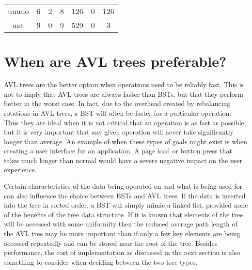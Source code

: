 \documentclass{article} %
\begin{document}
\begin{tabular}{c|c|c|c|c|c|c|}
\multicolumn{1}{|c|}{uuuuo} & 6                                                             & 2                                                              & 8                                                              & 126                                                           & 0                                                              & 126                                                            \\
\multicolumn{1}{|c|}{ant}   & 9                                                             & 0                                                              & 9                                                              & 529                                                           & 0                                                              & 3                                                              \\ \hline
\end{tabular}
\newpage
\doublespacing
\section{When are AVL trees preferable?}
\indent AVL trees are the better option when operations need to be reliably fast. This is not to imply that AVL trees are always faster than BSTs, but that they perform better in the worst case. In fact, due to the overhead created by rebalancing rotations in AVL trees, a BST will often be faster for a particular operation. Thus they are ideal when it is not critical that an operation is as fast as possible, but it is very important that any given operation will never take significantly longer than average. An example of when these types of goals might exist is when creating a user interface for an application. A page load or button press that takes much longer than normal would have a severe negative impact on the user experience.

Certain characteristics of the data being operated on and what is being used for can also influence the choice between BSTs and AVL trees. If the data is inserted into the tree in sorted order, a BST will simply mimic a linked list, provided none of the benefits of the tree data structure. If it is known that elements of the tree will be accessed with some uniformity then the reduced average path length of the AVL tree may be more important than if only a few key elements are being accessed repeatedly and can be stored near the root of the tree. Besides performance, the cost of implementation as discussed in the next section is also something to consider when deciding between the two tree types.
\end{document}

